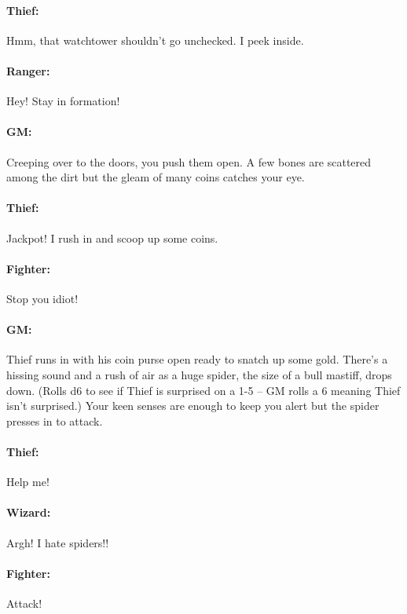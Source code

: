 \begin{multicols}{2}
\paragraph{Thief:} Hmm, that watchtower shouldn't go unchecked.  I peek inside.

\paragraph{Ranger:} Hey! Stay in formation!

\paragraph{GM:} Creeping over to the doors, you push them open.  A few bones are scattered among the dirt but the gleam of many coins catches your eye.

\paragraph{Thief:} Jackpot!  I rush in and scoop up some coins.

\paragraph{Fighter:} Stop you idiot!
 
\paragraph{GM:} Thief runs in with his coin purse open ready to snatch up some gold.  There's a hissing sound and a rush of air as a huge spider, the size of a bull mastiff, drops down.  (Rolls d6 to see if Thief is surprised on a 1-5 -- GM rolls a 6 meaning Thief isn't surprised.) Your keen senses are enough to keep you alert but the spider presses in to attack.

\paragraph{Thief:} Help me!

\paragraph{Wizard:} Argh!  I hate spiders!!

\paragraph{Fighter:} Attack!


\end{multicols}
